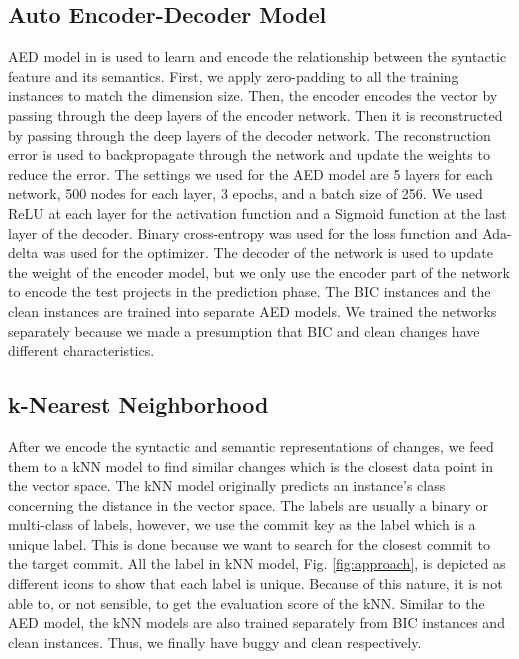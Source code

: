 \subsection{Auto Encoder-Decoder Model}
AED model in {\simfin} is used to learn and encode the relationship between the syntactic feature and its semantics.
First, we apply zero-padding to all the training instances to match the dimension size.
Then, the encoder encodes the vector by passing through the deep layers of the encoder network.
Then it is reconstructed by passing through the deep layers of the decoder network.
The reconstruction error is used to backpropagate through the network and update the weights to reduce the error.
The settings we used for the AED model are 5 layers for each network, 500 nodes for each layer, 3 epochs, and a batch size of 256.
We used ReLU at each layer for the activation function and a Sigmoid function at the last layer of the decoder.
Binary cross-entropy was used for the loss function and Ada-delta was used for the optimizer.
The decoder of the network is used to update the weight of the encoder model, but we only use the encoder part of the network to encode the test projects in the prediction phase.
The BIC instances and the clean instances are trained into separate AED models.
We trained the networks separately because we made a presumption that BIC and clean changes have different characteristics.

\subsection{k-Nearest Neighborhood}
After we encode the syntactic and semantic representations of changes, we feed them to a kNN model to find similar changes which is the closest data point in the vector space.
The kNN model originally predicts an instance's class concerning the distance in the vector space.
The labels are usually a binary or multi-class of labels, however, we use the commit key as the label which is a unique label.
This is done because we want to search for the closest commit to the target commit.
All the label in kNN model, Fig. \ref{fig:approach}, is depicted as different icons to show that each label is unique.
Because of this nature, it is not able to, or not sensible, to get the evaluation score of the kNN.
Similar to the AED model, the kNN models are also trained separately from BIC instances and clean instances.
Thus, we finally have buggy {\simfin} and clean {\simfin} respectively.

